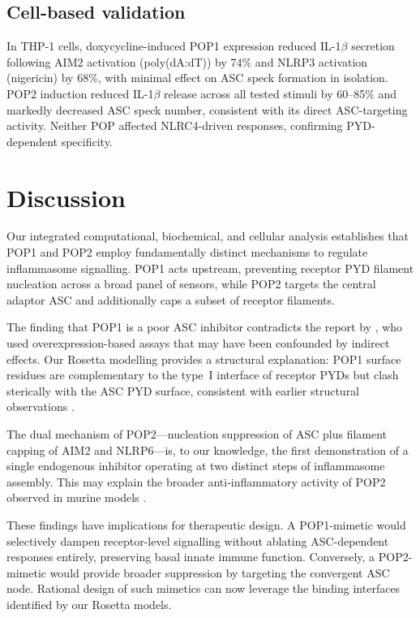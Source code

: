 \documentclass[12pt]{article}
\begin{document}
\subsection{Cell-based validation}

In THP-1 cells, doxycycline-induced POP1 expression reduced IL-1$\beta$ secretion following AIM2 activation (poly(dA:dT)) by 74\% and NLRP3 activation (nigericin) by 68\%, with minimal effect on ASC speck formation in isolation. POP2 induction reduced IL-1$\beta$ release across all tested stimuli by 60--85\% and markedly decreased ASC speck number, consistent with its direct ASC-targeting activity. Neither POP affected NLRC4-driven responses, confirming PYD-dependent specificity.

\section{Discussion}

Our integrated computational, biochemical, and cellular analysis establishes that POP1 and POP2 employ fundamentally distinct mechanisms to regulate inflammasome signalling. POP1 acts upstream, preventing receptor PYD filament nucleation across a broad panel of sensors, while POP2 targets the central adaptor ASC and additionally caps a subset of receptor filaments.

The finding that POP1 is a poor ASC inhibitor contradicts the report by \citet{de2007pynod}, who used overexpression-based assays that may have been confounded by indirect effects. Our Rosetta modelling provides a structural explanation: POP1 surface residues are complementary to the type~I interface of receptor PYDs but clash sterically with the ASC PYD surface, consistent with earlier structural observations \citep{sborgi2015structure}.

The dual mechanism of POP2---nucleation suppression of ASC plus filament capping of AIM2 and NLRP6---is, to our knowledge, the first demonstration of a single endogenous inhibitor operating at two distinct steps of inflammasome assembly. This may explain the broader anti-inflammatory activity of POP2 observed in murine models \citep{dorfleutner2015inhibiting}.

These findings have implications for therapeutic design. A POP1-mimetic would selectively dampen receptor-level signalling without ablating ASC-dependent responses entirely, preserving basal innate immune function. Conversely, a POP2-mimetic would provide broader suppression by targeting the convergent ASC node. Rational design of such mimetics can now leverage the binding interfaces identified by our Rosetta models.
\end{document}
